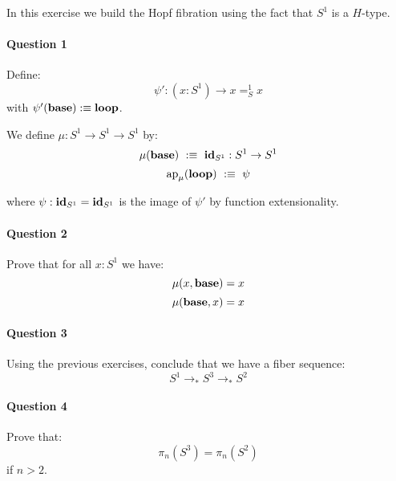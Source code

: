 \documentclass{article}[6pt]%
\renewcommand{\r}{\rightarrow}
\newcommand{\ap}{\mathrm{ap}}
\newcommand{\id}{\mathrm{\bf id}}
\newcommand{\base}{\mathrm{\bf base}}
\renewcommand{\loop}{\mathrm{\bf loop}}
\begin{document}
\begin{Exercise}

In this exercise we build the Hopf fibration using the fact that $S^1$ is a $H$-type.

\paragraph{Question 1} Define: 
\[\psi' : (x:S^1)\r x=_S^1x\]
with $\psi'(\base) :\equiv \loop$.

\vspace{0.4cm}

We define $\mu : S^1\r  S^1\r S^1$ by:
\[\mu(\base) \ :\equiv\ \id_{S^1} : S^1\r S^1\]
\[\ap_\mu(\loop) \ :\equiv\ \psi\]

where $\psi : \id_{S^1}=\id_{S^1}$ is the image of $\psi'$ by function extensionality.

\paragraph{Question 2}
Prove that for all $x:S^1$ we have:
\[\mu(x,\base) = x\]
\[\mu(\base,x) = x\]

\paragraph{Question 3} Using the previous exercises, conclude that we have a fiber sequence:
\[S^1\r_* S^3\r_* S^2\]

\paragraph{Question 4} Prove that:
\[\pi_n(S^3) = \pi_n(S^2)\]
if $n>2$.

\end{Exercise}
\end{document}

